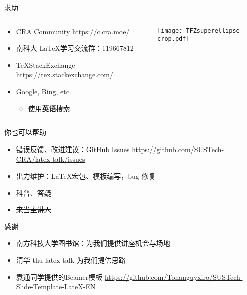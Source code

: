 \begin{frame}{求助}
  \begin{columns}[c]
    \begin{column}{.45\textwidth}
      \begin{itemize}
        \item CRA Community \url{https://c.cra.moe/}
        \item 南科大 \LaTeX 学习交流群：119667812
        \item \TeX StackExchange \url{https://tex.stackexchange.com/}
        \item Google, Bing, etc.
          \begin{itemize}
            \item 使用\textbf{英语}搜索
          \end{itemize}
      \end{itemize}
    \end{column}
    \begin{column}{.45\textwidth}
      \texttt{[image: TFZsuperellipse-crop.pdf]}
    \end{column}
  \end{columns}
\end{frame}

\begin{frame}{你也可以帮助}
  \begin{itemize}
    \item 错误反馈、改进建议：GitHub Issues \url{https://github.com/SUSTech-CRA/latex-talk/issues}
    \item 出力维护：\LaTeX 宏包、模板编写，bug 修复
    \item 科普、答疑 
    \item \sout{来当主讲人}
  \end{itemize}
\end{frame}

\begin{frame}{感谢}
  \begin{itemize}
    \item 南方科技大学图书馆：为我们提供讲座机会与场地
    \item 清华 thu-latex-talk  为我们提供思路
    \item 袁通同学提供的Beamer模板 \url{https://github.com/Tonanguyxiro/SUSTech-Slide-Template-LateX-EN}
  \end{itemize}
\end{frame}
